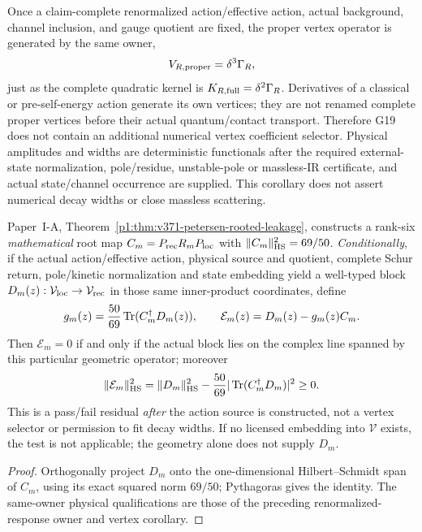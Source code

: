 \documentclass[12pt,a4paper]{article}
\begin{document}
\begin{corollary}
\label{p7:cor:v261-no-independent-vertex-selector}
Once a claim-complete renormalized action/effective action, actual background,
channel inclusion, and gauge quotient are fixed, the proper vertex operator is
generated by the same owner,
\[
 V_{R,\rm proper}=\delta^3\Gamma_R,
\]
just as the complete quadratic kernel is
\(K_{R,\rm full}=\delta^2\Gamma_R\).  Derivatives of a classical or
pre-self-energy action generate its own vertices; they are not renamed
complete proper vertices before their actual quantum/contact transport.
Therefore G19 does
not contain an additional numerical vertex coefficient selector.  Physical
amplitudes and widths are deterministic functionals after the required
external-state normalization, pole/residue, unstable-pole or massless-IR
certificate, and actual state/channel occurrence are supplied.  This
corollary does not assert numerical decay widths or close massless scattering.
\end{corollary}


\begin{proposition}
\label{p5c:prop:v371-petersen-rooted-action-diagnostic}
Paper~I-A, Theorem~\ref{p1:thm:v371-petersen-rooted-leakage},
constructs a rank-six \emph{mathematical} root map
$C_m=P_{\rm rec}R_mP_{\rm loc}$ with
$\|C_m\|_{\rm HS}^2=69/50$.
\emph{Conditionally}, if the actual action/effective action, physical
source and quotient, complete Schur return, pole/kinetic normalization
and state embedding yield a well-typed block
$D_m(z):\mathcal V_{\rm loc}\to\mathcal V_{\rm rec}$ in those same
inner-product coordinates, define
\[
 g_m(z)={50\over69}\operatorname{Tr}
          (C_m^\dagger D_m(z)),\qquad
 \mathcal E_m(z)=D_m(z)-g_m(z)C_m.
\]
Then $\mathcal E_m=0$ if and only if the actual block lies on the
complex line spanned by this particular geometric operator; moreover
\[
 \|\mathcal E_m\|_{\rm HS}^2
 =\|D_m\|_{\rm HS}^2-{50\over69}
       |\operatorname{Tr}(C_m^\dagger D_m)|^2\ge0.
\]
This is a pass/fail residual \emph{after} the action source is
constructed, not a vertex selector or permission to fit decay widths.
If no licensed embedding into $\mathcal V$ exists, the test is not
applicable; the geometry alone does not supply $D_m$.
\end{proposition}
\begin{proof}
Orthogonally project $D_m$ onto the one-dimensional Hilbert--Schmidt
span of $C_m$, using its exact squared norm $69/50$; Pythagoras gives
the identity. The same-owner physical qualifications are those of
the preceding renormalized-response owner and vertex corollary.
\end{proof}
\end{document}

